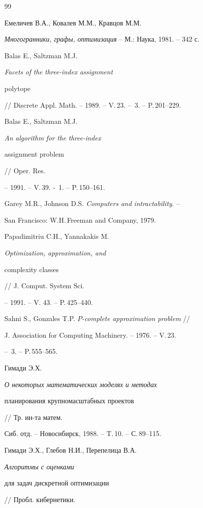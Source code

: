 \begin{thebibliography} {99}







Емеличев В.А., Ковалев М.М., Кравцов М.М. 


{\em Многогранники, графы, оптимизация} -- М.: Наука, 1981. -- 342 с. 




Balas E., Saltzman M.J. {\em Facets of the three-index assignment 


polytope}


// Discrete Appl. Math. -- 1989. -- V.\,23. -- \No\,3. -- P.\,201--229. 




Balas E., Saltzman M.J. {\em An algorithm for the three-index 


assignment problem} // Oper. Res. 


-- 1991. -- V.\,39. - \No\,1. -- P.\,150--161.




Garey M.R., Johnson D.S. {\em Computers and intractability}. --


San Francisco: W.H.\,Freeman and Company, 1979.




Papadimitriu C.H., Yannakakis M. {\em Optimization, approximation, and


complexity classes} // J. Comput. System Sci. 


-- 1991. -- V. 43. -- P.\,425--440. 




Sahni S., Gonzales T.P. {\em $P$-complete approximation problem} //


J. Association for Computing Machinery. -- 1976. -- V.\,23.


-- \No\,3. -- P.\,555--565.




Гимади Э.Х.{\em О некоторых математических моделях и методах


планирования крупномасштабных проектов} // Тр. ин-та матем.


Сиб. отд. -- Новосибирск, 1988. -- T.\,10. -- С.\,89--115.




Гимади Э.Х., Глебов Н.И., Перепелица В.А. {\em Алгоритмы с оценками 


для задач дискретной оптимизации} // Пробл. кибернетики. 



\end{thebibliography}
